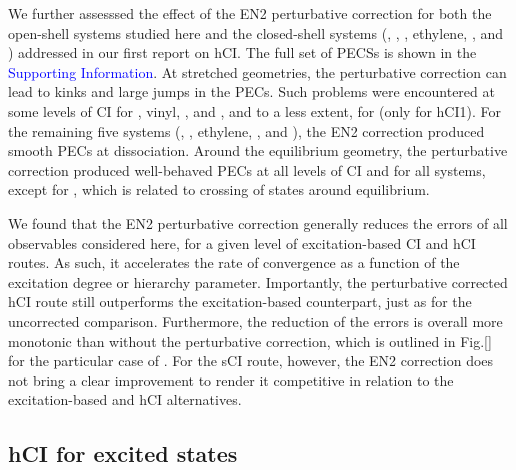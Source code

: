 \documentclass[aip,jcp,reprint,noshowkeys,superscriptaddress]{revtex4-1}
\newcommand{\SupInf}{\textcolor{blue}{Supporting Information}}
\begin{document}
We further assesssed the effect of the EN2 perturbative correction for both the open-shell systems studied here 
and the closed-shell systems (, , , ethylene, , and ) addressed in our first report on hCI. \cite{Kossoski_2022}
The full set of PECSs is shown in the {\SupInf}.
At stretched geometries, the perturbative correction can lead to kinks and large jumps in the PECs.
Such problems were encountered at some levels of CI for , vinyl, , and , and to a less extent, for  (only for hCI1).
For the remaining five systems (, , ethylene, , and ),
the EN2 correction produced smooth PECs at dissociation.
Around the equilibrium geometry, the perturbative correction produced well-behaved PECs at all levels of CI and for all systems, 
except for , which is related to crossing of states around equilibrium.

We found that the EN2 perturbative correction generally reduces the errors of all observables considered here, for a given level of excitation-based CI and hCI routes.
As such, it accelerates the rate of convergence as a function of the excitation degree or hierarchy parameter.
Importantly, the perturbative corrected hCI route still outperforms the excitation-based counterpart, just as for the uncorrected comparison.
Furthermore, the reduction of the errors is overall more monotonic than without the perturbative correction,
which is outlined in Fig.\ref{} for the particular case of .
For the sCI route, however, the EN2 correction does not bring a clear improvement to render it competitive in relation to the excitation-based and hCI alternatives.



 


\subsection{hCI for excited states}
\label{sec:res_B}

\end{document}

